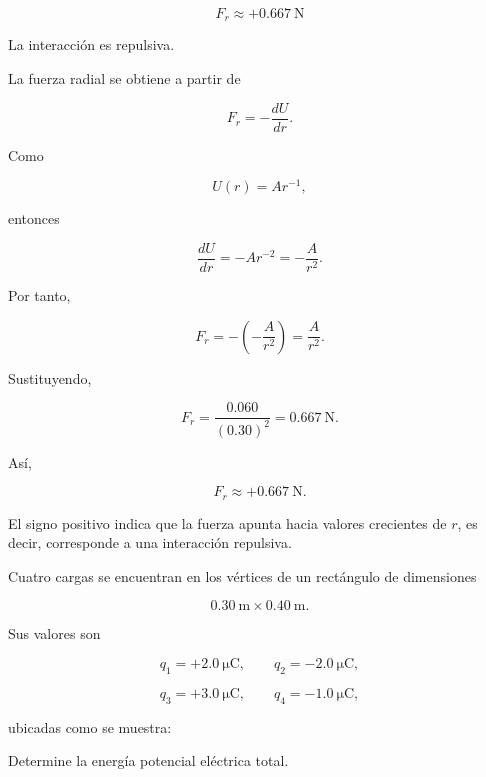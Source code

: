 \begin{respuesta}

\[
\boxed{F_r\approx+\SI{0.667}{\newton}}
\]

La interacción es repulsiva.

\end{respuesta}

\begin{explicacion}

La fuerza radial se obtiene a partir de

\[
F_r=-\frac{dU}{dr}.
\]

Como

\[
U(r)=Ar^{-1},
\]

entonces

\[
\frac{dU}{dr}
=
-Ar^{-2}
=
-\frac{A}{r^2}.
\]

Por tanto,

\[
F_r
=
-\left(-\frac{A}{r^2}\right)
=
\frac{A}{r^2}.
\]

Sustituyendo,

\[
F_r
=
\frac{0.060}{(0.30)^2}
=
\SI{0.667}{\newton}.
\]

Así,

\[
\boxed{F_r\approx+\SI{0.667}{\newton}}.
\]

El signo positivo indica que la fuerza apunta hacia valores crecientes de \(r\), es
decir, corresponde a una interacción repulsiva.

\end{explicacion}


\begin{ejercicio}

Cuatro cargas se encuentran en los vértices de un rectángulo de dimensiones

\[
\SI{0.30}{\metre}\times\SI{0.40}{\metre}.
\]

Sus valores son

\[
q_1=+\SI{2.0}{\micro\coulomb},
\qquad
q_2=-\SI{2.0}{\micro\coulomb},
\]

\[
q_3=+\SI{3.0}{\micro\coulomb},
\qquad
q_4=-\SI{1.0}{\micro\coulomb},
\]

ubicadas como se muestra:

\begin{center}
\end{center}

Determine la energía potencial eléctrica total.

\end{ejercicio}

